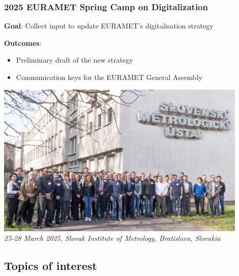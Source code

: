 \documentclass{beamer}
\begin{document}
    \begin{frame}
        \frametitle{2025 EURAMET Spring Camp on Digitalization}
        \textbf{Goal}: Collect input to update EURAMET's digitalisation strategy

        \textbf{Outcomes}:
        \begin{itemize}
            \item Preliminary draft of the new strategy
            \item Communication keys for the EURAMET General Assembly
        \end{itemize}

        \begin{center}
            \includegraphics[width=0.9\textwidth, trim=0 0 0 1200, clip]{assets/spring_camp}\\
            \footnotesize
            \textit{25-28 March 2025, Slovak Institute of Metrology, Bratislava, Slovakia}
        \end{center}
    \end{frame}

    \subsection{Topics of interest}
\end{document}
